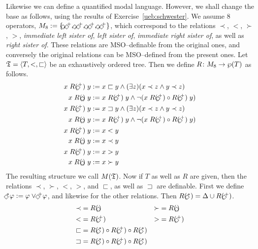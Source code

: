 Likewise we can define a quantified modal language.
However, we shall change the base as follows, using the
results of Exercise~\ref{ueb:schwester}. We assume 8 operators,
$M_8 := \{\oben, \oben^+, \unten, \unten^+, \rechts, \rechts^+,
\links, \links^+\}$, 
\index{$\oben$, $\oben^+$, $\unten$, $\unten^+$, $\rechts$, $\rechts^+$, $\links$, $\links^+$}%
which correspond to the 
relations $\prec$, $<$, $\succ$, $>$, {\it immediate left
sister of}, {\it left sister of}, {\it immediate right sister
of}, as well as {\it right sister of}. These relations are
MSO--definable from the original ones, and conversely the original 
relations can be MSO--defined from the present ones. Let 
$\mathfrak{T} = \langle T, <, \sqsubset\rangle$ be an exhaustively ordered tree. 
Then we define $R \colon M_8 \rightarrow \wp(T)$ as follows.
\begin{equation}
\begin{split}
x\; R(\rechts^+)\; y & := x \sqsubset y \und (\exists z)(x \prec z
\und y \prec z) \\
x\; R(\rechts)\; y & := x\; R(\rechts^+)\; y \und
    \nicht (x\; R(\rechts^+) \circ R(\rechts^+)\; y) \\
x\; R(\links^+)\; y & := x \sqsupset y \und (\exists z)(x \prec z
	\und y \prec z) \\
x\; R(\links)\; y & := x\; R(\links^+)\; y \und
    \nicht (x\; R(\links^+) \circ R(\links^+)\; y) \\
x\; R(\oben^+)\; y & := x < y \\
x\; R(\oben)\; y & := x \prec y \\
x\; R(\unten^+)\; y & := x > y \\
x\; R(\unten)\; y & := x \succ y 
\end{split}
\end{equation}
The resulting structure we call $M(\mathfrak{T})$. Now if $T$ as well as
$R$ are given, then the relations $\prec$, $\succ$, $<$, $>$,
and $\sqsubset$, as well as $\sqsupset$ are definable.
First we define $\oben^{\ast} \varphi := \varphi \oder
\oben^+ \varphi$, and likewise for the other relations.
Then $R(\oben^{\ast}) = \Delta \cup R(\oben^+)$.
\begin{equation}
\begin{split}
\prec & = R(\oben) & \succ & = R(\unten) \\
< & = R(\oben^+) & > & = R(\unten^+) \\
\sqsubset & = R(\oben^{\ast}) \circ R(\rechts^+) \circ
    R(\unten^{\ast}) \\
\sqsupset & = R(\oben^{\ast}) \circ R(\links^+) \circ
    R(\unten^{\ast}) 
\end{split}
\end{equation}
